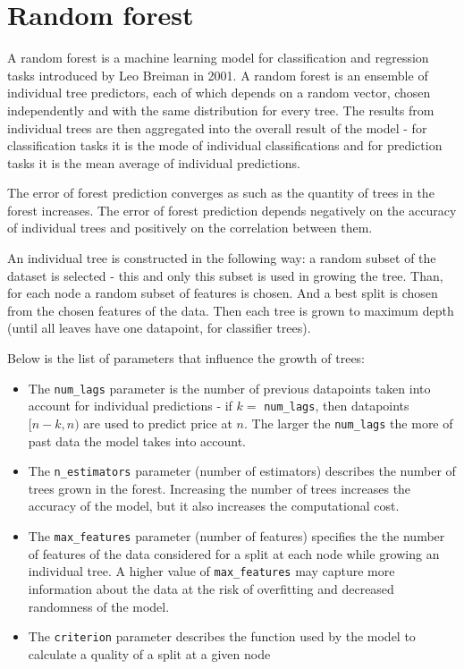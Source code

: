 \section{Random forest}
A random forest \cite{random_forest} is a machine learning model for classification and regression tasks introduced by Leo Breiman in 2001. A random forest is an ensemble of individual tree predictors, each of which depends on a random vector, chosen independently and with the same distribution for every tree. The results from individual trees are then aggregated into the overall result of the model - for classification tasks it is the mode of individual classifications and for prediction tasks it is the mean average of individual predictions.

The error of forest prediction converges as such as the quantity of trees in the forest increases. The error of forest prediction depends negatively on the accuracy of individual trees and positively on the correlation between them.

An individual tree is constructed in the following way: a random subset of the dataset is selected - this and only this subset is used in growing the tree.
Than, for each node a random subset of features is chosen. And a best split is chosen from the chosen features of the data. Then each tree is grown to maximum depth (until all leaves have one datapoint, for classifier trees).

Below is the list of parameters that influence the growth of trees:

\begin{itemize}

	\item The \verb|num_lags| parameter is the number of previous datapoints taken into account for individual predictions - if \(k=\) \verb|num_lags|, then datapoints \([n-k, n)\) are used to predict price at \(n\). The larger the \verb|num_lags| the more of past data the model takes into account.

	\item The \verb|n_estimators| parameter (number of estimators) describes the number of trees grown in the forest. Increasing the number of trees increases the accuracy of the model, but it also increases the computational cost.

	\item The \verb|max_features| parameter (number of features) specifies the the number of features of the data considered for a split at each node while growing an individual tree. A higher value of \verb|max_features| may capture more information about the data at the risk
	      of overfitting and decreased randomness of the model.

	\item The \verb|criterion| parameter describes the function used by the model to calculate a quality of a split at a given node

\end{itemize}


